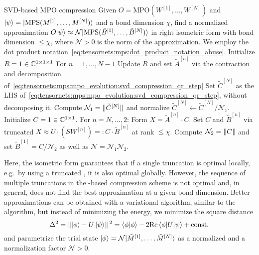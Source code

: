 \begin{Algorithm}{SVD-based MPO compression}{
    \label{algo:tensornets:mps:svd_based_mpo_compression}
    Given $O = \text{MPO}(W^{[1]}, \dots, W^{[N]})$ and $\ket{\psi} = \ket{\text{MPS}(M^{[1]}, \dots, M^{[N]})}$ and a bond dimension $\chi$, find a normalized  approximation $O \ket{\psi} \approx \mathcal{N} \ket{\text{MPS}(\tilde{B}^{[1]}, \dots, \tilde{B}^{[N]})}$ in right isometric form with bond dimension $\leq \chi$, where $\mathcal{N} > 0$ is the norm of the approximation.
    We employ the dot product notation~\eqref{eq:tensornets:mps:dot_product_notation_abuse}.
}
    \step Initialize $R = 1 \in \mathbb{C}^{1\times1\times1}$
    \step For $n = 1, \dots, N-1$
    \step \quad Update $R$ and set $\tilde{A}^{[n]}$ via the contraction and  decomposition of~\eqref{eq:tensornets:mps:mpo_evolution:svd_compression_qr_step}
    \step Set $\tilde{C}^{[N]}$ as the LHS of~\eqref{eq:tensornets:mps:mpo_evolution:svd_compression_qr_step}, without decomposing it.
    \step Compute $\mathcal{N}_1 = \norm{\tilde{C}^{[N]}}$ and normalize $\tilde{C}^{[N]} \gets \tilde{C}^{[N]} / \mathcal{N}_1$.
    \step Initialize $C = 1 \in \mathbb{C}^{1\times 1}$.
    \step For $n=N,\dots,2$:
    \step \quad Form $X = \tilde{A}^{[n]} \cdot C$.
    \step \quad Set $C$ and $\tilde{B}^{[n]}$ via truncated  $X \approx U \cdot (S W^{[n]}) =: C \cdot \tilde{B}^{[n]}$ at rank $\leq \chi$.
    \step Compute $\mathcal{N}_2 = \norm{C}$ and set $\tilde{B}^{[1]} = C / \mathcal{N}_2$ as well as $\mathcal{N} = \mathcal{N}_1 \mathcal{N}_2$.
\end{Algorithm}

Here, the isometric form guarantees that if a single truncation is optimal locally, e.g.~by using a truncated , it is also optimal globally.
%
However, the sequence of multiple truncations in the -based compression scheme is not optimal and, in general, does not find the best  approximation at a given bond dimension.
%
Better approximations can be obtained with a variational algorithm, similar to the  algorithm, but instead of minimizing the energy, we minimize the square distance
\begin{equation}
    \Delta^2
    = \norm{\ket{\phi} - U \ket{\psi}}^2
    = \braket{\phi}{\phi} - 2 \mathrm{Re} \braopket{\phi}{U}{\psi} \pconst
\end{equation}
%
and parametrize the trial state $\ket{\phi} = \mathcal{N} \ket{\tilde{M}^{[1]}, \dots, \tilde{M}^{[N]}}$ as a normalized  and a normalization factor $\mathcal{N} > 0$.

